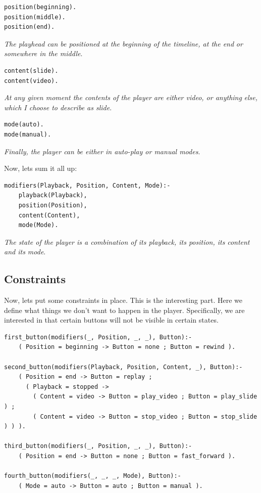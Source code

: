 \documentclass[11pt]{article}
\begin{document}
\begin{verbatim}
position(beginning).
position(middle).
position(end).
\end{verbatim}

\emph{The playhead can be positioned at the beginning of the timeline, at the end}
\emph{or somewhere in the middle}.

\begin{verbatim}
content(slide).
content(video).
\end{verbatim}

\emph{At any given moment the contents of the player are either video, or anything}
\emph{else, which I choose to describe as slide}.

\begin{verbatim}
mode(auto).
mode(manual).
\end{verbatim}

\emph{Finally, the player can be either in auto-play or manual modes}.

Now, lets sum it all up:

\begin{verbatim}
modifiers(Playback, Position, Content, Mode):-
    playback(Playback),
    position(Position),
    content(Content),
    mode(Mode).
\end{verbatim}

\emph{The state of the player is a combination of its playback, its position, its}
\emph{content and its mode}.
\subsection{Constraints}
\label{sec-2-2}

Now, lets put some constraints in place.  This is the interesting part.  Here we
define what things we don't want to happen in the player.  Specifically, we are
interested in that certain buttons will not be visible in certain states.

\begin{verbatim}
first_button(modifiers(_, Position, _, _), Button):-
    ( Position = beginning -> Button = none ; Button = rewind ).

second_button(modifiers(Playback, Position, Content, _), Button):-
    ( Position = end -> Button = replay ;
      ( Playback = stopped ->
        ( Content = video -> Button = play_video ; Button = play_slide ) ;
        ( Content = video -> Button = stop_video ; Button = stop_slide ) ) ).

third_button(modifiers(_, Position, _, _), Button):-
    ( Position = end -> Button = none ; Button = fast_forward ).

fourth_button(modifiers(_, _, _, Mode), Button):-
    ( Mode = auto -> Button = auto ; Button = manual ).
\end{verbatim}
\end{document}
